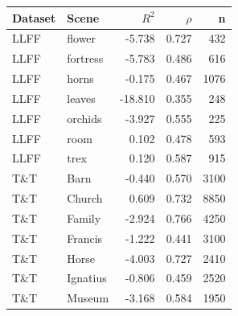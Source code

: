\begin{tabular}{llrrr}
\toprule
Dataset & Scene & $R^2$ & $\rho$ & n \\
\midrule
LLFF & flower & -5.738 & 0.727 & 432 \\
LLFF & fortress & -5.783 & 0.486 & 616 \\
LLFF & horns & -0.175 & 0.467 & 1076 \\
LLFF & leaves & -18.810 & 0.355 & 248 \\
LLFF & orchids & -3.927 & 0.555 & 225 \\
LLFF & room & 0.102 & 0.478 & 593 \\
LLFF & trex & 0.120 & 0.587 & 915 \\
T\&T & Barn & -0.440 & 0.570 & 3100 \\
T\&T & Church & 0.609 & 0.732 & 8850 \\
T\&T & Family & -2.924 & 0.766 & 4250 \\
T\&T & Francis & -1.222 & 0.441 & 3100 \\
T\&T & Horse & -4.003 & 0.727 & 2410 \\
T\&T & Ignatius & -0.806 & 0.459 & 2520 \\
T\&T & Museum & -3.168 & 0.584 & 1950 \\
\bottomrule
\end{tabular}
